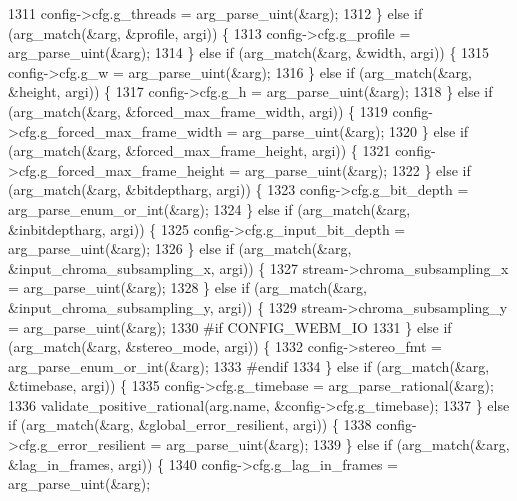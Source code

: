 \begin{DoxyCodeInclude}
{{{{{{{{{{{{{{{{1311       config->cfg.g\_threads = arg\_parse\_uint(&arg);
1312     \} \textcolor{keywordflow}{else} \textcolor{keywordflow}{if} (arg\_match(&arg, &profile, argi)) \{
1313       config->cfg.g\_profile = arg\_parse\_uint(&arg);
1314     \} \textcolor{keywordflow}{else} \textcolor{keywordflow}{if} (arg\_match(&arg, &width, argi)) \{
1315       config->cfg.g\_w = arg\_parse\_uint(&arg);
1316     \} \textcolor{keywordflow}{else} \textcolor{keywordflow}{if} (arg\_match(&arg, &height, argi)) \{
1317       config->cfg.g\_h = arg\_parse\_uint(&arg);
1318     \} \textcolor{keywordflow}{else} \textcolor{keywordflow}{if} (arg\_match(&arg, &forced\_max\_frame\_width, argi)) \{
1319       config->cfg.g\_forced\_max\_frame\_width = arg\_parse\_uint(&arg);
1320     \} \textcolor{keywordflow}{else} \textcolor{keywordflow}{if} (arg\_match(&arg, &forced\_max\_frame\_height, argi)) \{
1321       config->cfg.g\_forced\_max\_frame\_height = arg\_parse\_uint(&arg);
1322     \} \textcolor{keywordflow}{else} \textcolor{keywordflow}{if} (arg\_match(&arg, &bitdeptharg, argi)) \{
1323       config->cfg.g\_bit\_depth = arg\_parse\_enum\_or\_int(&arg);
1324     \} \textcolor{keywordflow}{else} \textcolor{keywordflow}{if} (arg\_match(&arg, &inbitdeptharg, argi)) \{
1325       config->cfg.g\_input\_bit\_depth = arg\_parse\_uint(&arg);
1326     \} \textcolor{keywordflow}{else} \textcolor{keywordflow}{if} (arg\_match(&arg, &input\_chroma\_subsampling\_x, argi)) \{
1327       stream->chroma\_subsampling\_x = arg\_parse\_uint(&arg);
1328     \} \textcolor{keywordflow}{else} \textcolor{keywordflow}{if} (arg\_match(&arg, &input\_chroma\_subsampling\_y, argi)) \{
1329       stream->chroma\_subsampling\_y = arg\_parse\_uint(&arg);
1330 \textcolor{preprocessor}{#if CONFIG\_WEBM\_IO}
1331     \} \textcolor{keywordflow}{else} \textcolor{keywordflow}{if} (arg\_match(&arg, &stereo\_mode, argi)) \{
1332       config->stereo\_fmt = arg\_parse\_enum\_or\_int(&arg);
1333 \textcolor{preprocessor}{#endif}
1334     \} \textcolor{keywordflow}{else} \textcolor{keywordflow}{if} (arg\_match(&arg, &timebase, argi)) \{
1335       config->cfg.g\_timebase = arg\_parse\_rational(&arg);
1336       validate\_positive\_rational(arg.name, &config->cfg.g\_timebase);
1337     \} \textcolor{keywordflow}{else} \textcolor{keywordflow}{if} (arg\_match(&arg, &global\_error\_resilient, argi)) \{
1338       config->cfg.g\_error\_resilient = arg\_parse\_uint(&arg);
1339     \} \textcolor{keywordflow}{else} \textcolor{keywordflow}{if} (arg\_match(&arg, &lag\_in\_frames, argi)) \{
1340       config->cfg.g\_lag\_in\_frames = arg\_parse\_uint(&arg);
}}}}}}}}}}}}}}}}
\end{DoxyCodeInclude}
